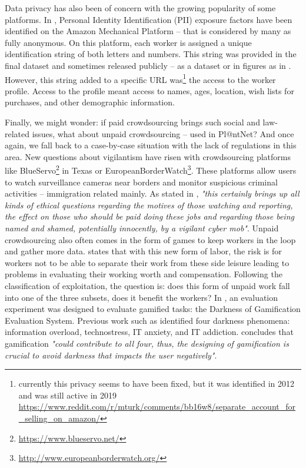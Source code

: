 Data privacy has also been of concern with the growing popularity of some platforms.
In \citet{lease2013mechanical}, Personal Identity Identification (PII) exposure factors have been identified on the Amazon Mechanical Platform -- that is considered by many as fully anonymous.
On this platform, each worker is assigned a unique identification string of both letters and numbers.
This string was provided in the final dataset and sometimes released publicly -- as a dataset or in figures as in \citet{gao2015cost}.
However, this string added to a specific URL was\footnote{currently this privacy seems to have been fixed, but it was identified in 2012 and was still active in 2019 \url{https://www.reddit.com/r/mturk/comments/bb16w8/separate_account_for_selling_on_amazon/}} the access to the worker profile.
Access to the profile meant access to names, ages, location, wish lists for purchases, and other demographic information.

Finally, we might wonder: if paid crowdsourcing brings such social and law-related issues, what about unpaid crowdsourcing -- used in Pl@ntNet?
And once again, we fall back to a case-by-case situation with the lack of regulations in this area.
New questions about vigilantism have risen with crowdsourcing platforms like BlueServo\footnote{\url{https://www.blueservo.net/}} in Texas or EuropeanBorderWatch\footnote{\url{http://www.europeanborderwatch.org/}}.
These platforms allow users to watch surveillance cameras near borders and monitor suspicious criminal activities -- immigration related mainly.
As stated in \citet{schmidt2013good}, \emph{"this
certainly brings up all kinds of ethical questions regarding the motives of those watching and reporting, the effect on those who should be paid doing these jobs and regarding those being named and shamed, potentially innocently, by a vigilant cyber mob"}.
Unpaid crowdsourcing also often comes in the form of games to keep workers in the loop and gather more data.
\citet{roglallwork} states that with this new form of labor, the risk is for workers not to be able to separate their work from these side leisure leading to problems in evaluating their working worth and compensation.
Following the classification of exploitation, the question is: does this form of unpaid work fall into one of the three subsets, does it benefit the workers?
In \citet{nystrom2021exploring}, an evaluation experiment was designed to evaluate gamified tasks: the Darkness of Gamification Evaluation System.
Previous work such as \citet{pirkkalainen2016two} identified four darkness phenomena: information overload, technostress, IT anxiety, and IT addiction.
\citet{nystrom2021exploring} concludes that gamification \emph{"could contribute to all four, thus, the designing of gamification is crucial to avoid darkness that impacts the user negatively"}.

